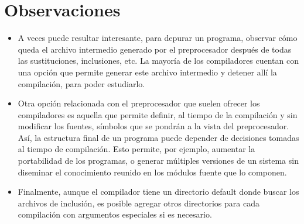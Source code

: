 \section{Observaciones}
\begin{itemize}
	\item A veces puede resultar interesante, para depurar un programa, observar cómo queda el archivo
intermedio generado por el preprocesador después de todas las sustituciones, inclusiones, etc. La
mayoría de los compiladores cuentan con una opción que permite generar este archivo intermedio y
detener allí la compilación, para poder estudiarlo.
	\item Otra opción relacionada con el preprocesador que suelen ofrecer los compiladores es aquella que
permite definir, al tiempo de la compilación y sin modificar los fuentes, símbolos que se pondrán a la
vista del preprocesador. Así, la estructura final de un programa puede depender de decisiones tomadas
al tiempo de compilación. Esto permite, por ejemplo, aumentar la portabilidad de los programas, o
generar múltiples versiones de un sistema sin diseminar el conocimiento reunido en los módulos
fuente que lo componen.
	\item Finalmente, aunque el compilador tiene un directorio default donde buscar los archivos de inclusión,
es posible agregar otros directorios para cada compilación con argumentos especiales si es necesario.
\end{itemize}




